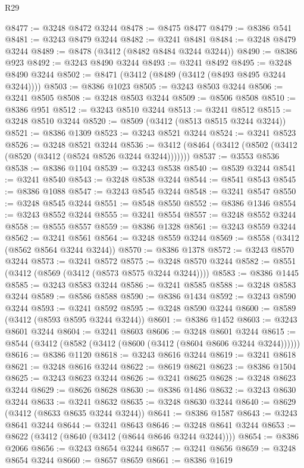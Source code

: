 \begin{lexlean}{R29}
\begin{coremodule}
@8477 := @3248 @8472 @3244
@8478 := @8475 @8477
@8479 := @8386 @541
@8481 := @3243 @8479 @3244
@8482 := @3241 @8481
@8484 := @3248 @8479 @3244
@8489 := @8478 (@3412 (@8482 @8484 @3244 @3244))
@8490 := @8386 @923
@8492 := @3243 @8490 @3244
@8493 := @3241 @8492
@8495 := @3248 @8490 @3244
@8502 := @8471 (@3412 (@8489 (@3412 (@8493 @8495 @3244 @3244))))
@8503 := @8386 @1023
@8505 := @3243 @8503 @3244
@8506 := @3241 @8505
@8508 := @3248 @8503 @3244
@8509 := @8506 @8508
@8510 := @8386 @951
@8512 := @3243 @8510 @3244
@8513 := @3241 @8512
@8515 := @3248 @8510 @3244
@8520 := @8509 (@3412 (@8513 @8515 @3244 @3244))
@8521 := @8386 @1309
@8523 := @3243 @8521 @3244
@8524 := @3241 @8523
@8526 := @3248 @8521 @3244
@8536 := @3412 (@8464 (@3412 (@8502 (@3412 (@8520 (@3412 (@8524 @8526 @3244 @3244)))))))
@8537 := @3553 @8536
@8538 := @8386 @1104
@8539 := @3243 @8538
@8540 := @8539 @3244
@8541 := @3241 @8540
@8543 := @3248 @8538 @3244
@8544 := @8541 @8543
@8545 := @8386 @1088
@8547 := @3243 @8545 @3244
@8548 := @3241 @8547
@8550 := @3248 @8545 @3244
@8551 := @8548 @8550
@8552 := @8386 @1346
@8554 := @3243 @8552 @3244
@8555 := @3241 @8554
@8557 := @3248 @8552 @3244
@8558 := @8555 @8557
@8559 := @8386 @1328
@8561 := @3243 @8559 @3244
@8562 := @3241 @8561
@8564 := @3248 @8559 @3244
@8569 := @8558 (@3412 (@8562 @8564 @3244 @3244))
@8570 := @8386 @1378
@8572 := @3243 @8570 @3244
@8573 := @3241 @8572
@8575 := @3248 @8570 @3244
@8582 := @8551 (@3412 (@8569 (@3412 (@8573 @8575 @3244 @3244))))
@8583 := @8386 @1445
@8585 := @3243 @8583 @3244
@8586 := @3241 @8585
@8588 := @3248 @8583 @3244
@8589 := @8586 @8588
@8590 := @8386 @1434
@8592 := @3243 @8590 @3244
@8593 := @3241 @8592
@8595 := @3248 @8590 @3244
@8600 := @8589 (@3412 (@8593 @8595 @3244 @3244))
@8601 := @8386 @1452
@8603 := @3243 @8601 @3244
@8604 := @3241 @8603
@8606 := @3248 @8601 @3244
@8615 := @8544 (@3412 (@8582 (@3412 (@8600 (@3412 (@8604 @8606 @3244 @3244))))))
@8616 := @8386 @1120
@8618 := @3243 @8616 @3244
@8619 := @3241 @8618
@8621 := @3248 @8616 @3244
@8622 := @8619 @8621
@8623 := @8386 @1504
@8625 := @3243 @8623 @3244
@8626 := @3241 @8625
@8628 := @3248 @8623 @3244
@8629 := @8626 @8628
@8630 := @8386 @1486
@8632 := @3243 @8630 @3244
@8633 := @3241 @8632
@8635 := @3248 @8630 @3244
@8640 := @8629 (@3412 (@8633 @8635 @3244 @3244))
@8641 := @8386 @1587
@8643 := @3243 @8641 @3244
@8644 := @3241 @8643
@8646 := @3248 @8641 @3244
@8653 := @8622 (@3412 (@8640 (@3412 (@8644 @8646 @3244 @3244))))
@8654 := @8386 @2066
@8656 := @3243 @8654 @3244
@8657 := @3241 @8656
@8659 := @3248 @8654 @3244
@8660 := @8657 @8659
@8661 := @8386 @1619

\end{coremodule}
\end{lexlean}
